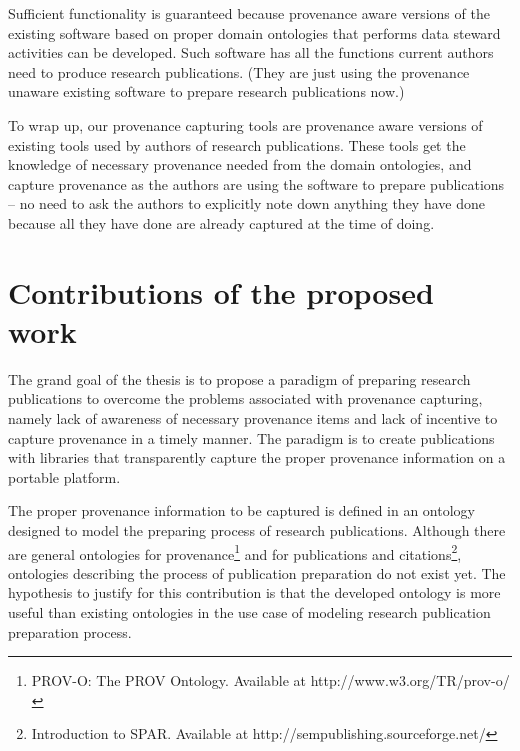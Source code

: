 Sufficient functionality is guaranteed because provenance aware versions of the existing software based on proper domain ontologies that performs data steward activities can be developed. Such software has all the functions current authors need to produce research publications. (They are just using the provenance unaware existing software to prepare research publications now.) 

To wrap up, our provenance capturing tools are provenance aware versions of existing tools used by authors of research publications. These tools get the knowledge of necessary provenance needed from the domain ontologies, and capture provenance as the authors are using the software to prepare publications -- no need to ask the authors to explicitly note down anything they have done because all they have done are already captured at the time of doing.

\section{Contributions of the proposed work}
The grand goal of the thesis is to propose a paradigm of preparing research publications to overcome the problems associated with provenance capturing, namely lack of awareness of necessary provenance items and lack of incentive to capture provenance in a timely manner. The paradigm is to create publications with libraries that transparently capture the proper provenance information on a portable platform.

The proper provenance information to be captured is defined in an ontology designed to model the preparing process of research publications. Although there are general ontologies for provenance\footnote{PROV-O: The PROV Ontology. Available at http://www.w3.org/TR/prov-o/} and for publications and citations\footnote{Introduction to SPAR. Available at http://sempublishing.sourceforge.net/}, ontologies describing the process of publication preparation do not exist yet. The hypothesis to justify for this contribution is that the developed ontology is more useful than existing ontologies in the use case of modeling research publication preparation process.

